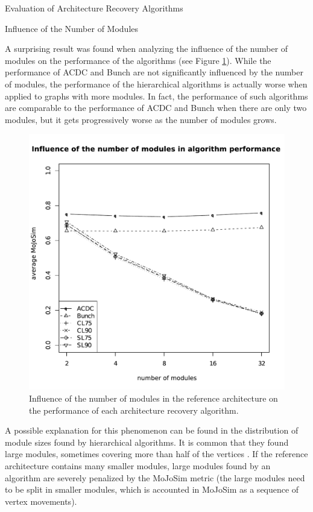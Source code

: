 \documentclass[11pt,twocolumn,a4paper,english]{article}
\begin{document}
\begin{section}{Evaluation of Architecture Recovery Algorithms}
\begin{subsection}{Influence of the Number of Modules}
	
	A surprising result was found when analyzing the influence of the number of modules on the performance of the algorithms (see Figure \ref{fig:exp-number-modules}). While the performance of ACDC and Bunch are not significantly influenced by the number of modules, the performance of the hierarchical algorithms is actually worse when applied to graphs with more modules. In fact, the performance of such algorithms are comparable to the performance of ACDC and Bunch when there are only two modules, but it gets  progressively worse as the number of modules grows.
	
	\begin{figure}[htbp]
		\centering
			\includegraphics[scale=0.5]{figures/exp-number-modules}
		\caption{Influence of the number of modules in the reference architecture on the performance of each architecture recovery algorithm.}
		\label{fig:exp-number-modules}
	\end{figure}
	
	A possible explanation for this phenomenon can be found in the distribution of module sizes found by hierarchical algorithms. It is common that they found large modules, sometimes covering more than half of the vertices \cite{Wu2005}. If the reference architecture contains many smaller modules, large modules found by an algorithm are severely penalized by the MoJoSim metric (the large modules need to be split in smaller modules, which is accounted in MoJoSim as a sequence of vertex movements).
	

\end{subsection}
\end{section}
\end{document}
